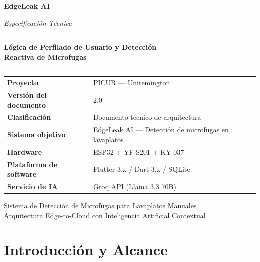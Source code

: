 \documentclass[12pt,a4paper]{article}
\begin{document}
\begin{titlepage}
    \centering
    \vspace*{2cm}
    {\Huge\bfseries EdgeLeak AI\par}
    \vspace{0.5cm}
    {\Large\itshape Especificación Técnica\par}
    \vspace{1cm}
    \rule{\linewidth}{0.5pt}
    \vspace{0.5cm}
    {\large\bfseries Lógica de Perfilado de Usuario y Detección\\[4pt]
    Reactiva de Microfugas\par}
    \vspace{0.5cm}
    \rule{\linewidth}{0.5pt}
    \vspace{2cm}

    \begin{tabularx}{0.85\textwidth}{lX}
        \toprule
        \textbf{Proyecto} & PICUR — Uniremington \\
        \textbf{Versión del documento} & 2.0 \\
        \textbf{Clasificación} & Documento técnico de arquitectura \\
        \textbf{Sistema objetivo} & EdgeLeak AI — Detección de microfugas en lavaplatos \\
        \textbf{Hardware} & ESP32 + YF-S201 + KY-037 \\
        \textbf{Plataforma de software} & Flutter 3.x / Dart 3.x / SQLite \\
        \textbf{Servicio de IA} & Groq API (Llama 3.3 70B) \\
        \bottomrule
    \end{tabularx}

    \vfill
    {\small Sistema de Detección de Microfugas para Lavaplatos Manuales\\
    Arquitectura Edge-to-Cloud con Inteligencia Artificial Contextual\par}
\end{titlepage}

\tableofcontents
\newpage

\section{Introducción y Alcance}
\end{document}
